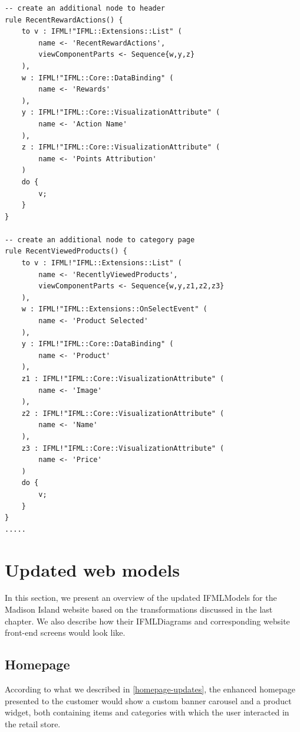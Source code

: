 \begin{lstlisting}[breaklines,style=AMMA,language=ATL,mathescape,rulesepcolor=\color{black},caption={ A fragment of the transformation},captionpos=b, aboveskip=0.2cm, belowskip=0cm, label={lst:IFMLRUD2IFML}]
-- create an additional node to header
rule RecentRewardActions() {
	to v : IFML!"IFML::Extensions::List" (
		name <- 'RecentRewardActions',
		viewComponentParts <- Sequence{w,y,z}
	),
	w : IFML!"IFML::Core::DataBinding" (
		name <- 'Rewards'
	),
	y : IFML!"IFML::Core::VisualizationAttribute" (
		name <- 'Action Name'
	),
	z : IFML!"IFML::Core::VisualizationAttribute" (
		name <- 'Points Attribution'
	)
	do {
		v;
	}
}

-- create an additional node to category page
rule RecentViewedProducts() {
	to v : IFML!"IFML::Extensions::List" (
		name <- 'RecentlyViewedProducts',
		viewComponentParts <- Sequence{w,y,z1,z2,z3}
	),
	w : IFML!"IFML::Extensions::OnSelectEvent" (
		name <- 'Product Selected'
	),
	y : IFML!"IFML::Core::DataBinding" (
		name <- 'Product'
	),
	z1 : IFML!"IFML::Core::VisualizationAttribute" (
		name <- 'Image'
	),
	z2 : IFML!"IFML::Core::VisualizationAttribute" (
		name <- 'Name'
	),
	z3 : IFML!"IFML::Core::VisualizationAttribute" (
		name <- 'Price'
	)
	do {
		v;
	}
}
.....
\end{lstlisting}
\vspace{0.5cm}


\newpage
\section{Updated web models}

In this section, we present an overview of the updated IFMLModels for the Madison Island website based on the transformations discussed in the last chapter. We also describe how their IFMLDiagrams and corresponding website front-end screens would look like.

\subsection{Homepage}

According to what we described in \ref{homepage-updates}, the enhanced homepage presented to the customer would show a custom banner carousel and a product widget, both containing items and categories with which the user interacted in the retail store.

